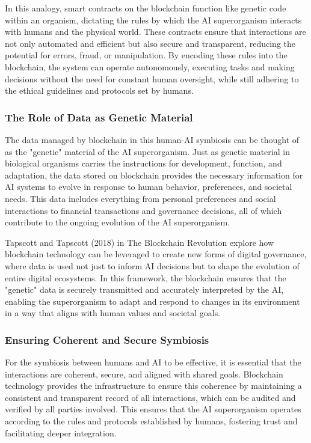 \documentclass[12pt,twoside]{article}
\begin{document}
In this analogy, smart contracts on the blockchain function like genetic code within an organism, dictating the rules by which the AI superorganism interacts with humans and the physical world. These contracts ensure that interactions are not only automated and efficient but also secure and transparent, reducing the potential for errors, fraud, or manipulation. By encoding these rules into the blockchain, the system can operate autonomously, executing tasks and making decisions without the need for constant human oversight, while still adhering to the ethical guidelines and protocols set by humans.

\subsubsection{The Role of Data as Genetic Material}

The data managed by blockchain in this human-AI symbiosis can be thought of as the "genetic" material of the AI superorganism. Just as genetic material in biological organisms carries the instructions for development, function, and adaptation, the data stored on blockchain provides the necessary information for AI systems to evolve in response to human behavior, preferences, and societal needs. This data includes everything from personal preferences and social interactions to financial transactions and governance decisions, all of which contribute to the ongoing evolution of the AI superorganism.

Tapscott and Tapscott (2018) in The Blockchain Revolution explore how blockchain technology can be leveraged to create new forms of digital governance, where data is used not just to inform AI decisions but to shape the evolution of entire digital ecosystems. In this framework, the blockchain ensures that the "genetic" data is securely transmitted and accurately interpreted by the AI, enabling the superorganism to adapt and respond to changes in its environment in a way that aligns with human values and societal goals.

\subsubsection{Ensuring Coherent and Secure Symbiosis}

For the symbiosis between humans and AI to be effective, it is essential that the interactions are coherent, secure, and aligned with shared goals. Blockchain technology provides the infrastructure to ensure this coherence by maintaining a consistent and transparent record of all interactions, which can be audited and verified by all parties involved. This ensures that the AI superorganism operates according to the rules and protocols established by humans, fostering trust and facilitating deeper integration.
\end{document}
